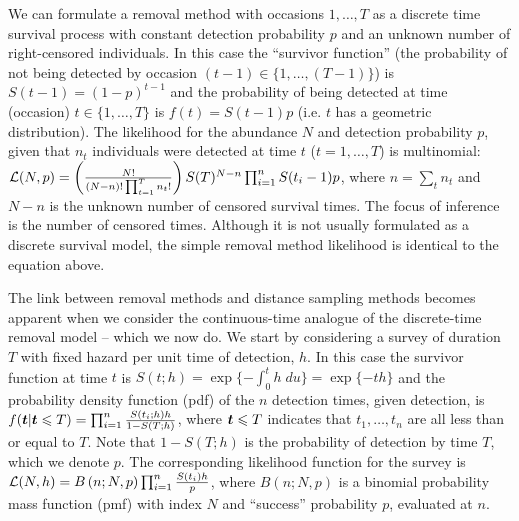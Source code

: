\documentclass[useAMS,usenatbib,referee]{biom}
\begin{document}
We can formulate a removal method with occasions $1,\ldots,T$ as a discrete time survival process with constant detection probability $p$ and an unknown number of right-censored individuals. In this case the ``survivor function'' (the probability of not being detected by occasion $(t-1)\in \{1,\ldots,(T-1)\}$) is $S(t-1)=(1-p)^{t-1}$ and the probability of being detected at time (occasion) $t\in \{1,\ldots,T\}$ is $f(t)=S(t-1)p$ (i.e. $t$ has a geometric distribution). The likelihood for the abundance $N$ and detection probability $p$, given that $n_t$ individuals were detected at time $t$ ($t=1,\ldots,T$) is multinomial: ${\cal L}(N,p)
=\left(\frac{N!}{(N-n)!\prod_{t=1}^Tn_t!}\right) S(T)^{N-n}\prod_{i=1}^{n}S(t_i-1)p$, where $n=\sum_t n_t$ and $N-n$ is the unknown number of censored survival times. The focus of inference is the number of censored times. Although it is not usually formulated as a discrete survival model, the simple removal method likelihood \citep[see Equation 5.4 on page 76 of][for example]{Borchers+al:02} is identical to the equation above. %

The link between removal methods and distance sampling methods becomes apparent when we consider the continuous-time analogue of the discrete-time removal model -- which we now do. We start by considering a survey of duration $T$ with fixed hazard per unit time of detection, $h$. In this case the survivor function at time $t$ is $S(t;h)=\exp\{-\int_0^th\;du\}=\exp\{-th\}$ and the probability density function (pdf) of the $n$ detection times, given detection, is $f(\mbox{\boldmath $t$}|\mbox{\boldmath $t$}\leqslant T)=\prod_{i=1}^n\frac{S(t_i;h)h}{1-S(T;h)}$, where $\mbox{\boldmath $t$}\leqslant T$ indicates that $t_1,\ldots,t_{n}$ are all less than or equal to $T$. Note that $1-S(T;h)$ is the probability of detection by time $T$, which we denote $p$. The corresponding likelihood function %
for the survey is ${\cal L}(N,h)=B\left(n;N,p\right)\prod_{i=1}^n\frac{S(t_i)h}{p}$, where $B\left(n;N,p\right)$ is a binomial probability mass function (pmf) with index $N$ and ``success'' probability $p$, evaluated at $n$.
\end{document}
